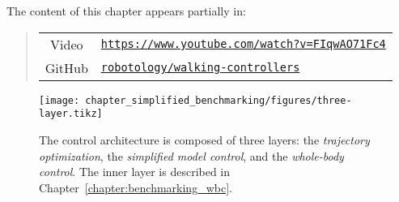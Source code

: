 \par
The content of this chapter appears partially in:
\begin{leftbar}
	\begin{quote}%
		 \vspace{5mm}\newline 
		 \vspace{5mm} \newline
		\begin{tabular}{c p{10.0cm}}
			     Video & \href{https://www.youtube.com/watch?v=FIqwAO71Fc4}{\texttt{https://www.youtube.com/watch?v=FIqwAO71Fc4}} \\
			     GitHub &  \href{https://github.com/robotology/walking-controllers}{\texttt{robotology/walking-controllers}} 
		\end{tabular}
	\end{quote}
\end{leftbar}

\begin{figure}[t]
    \centering
    \texttt{[image: chapter\_simplified\_benchmarking/figures/three-layer.tikz]}
    \caption[The three layer controller architecture for bipedal locomotion in rigid environment]{The control architecture is composed of three layers: the \emph{trajectory optimization}, the \emph{simplified model control}, and the \emph{whole-body control}. The inner layer is described in Chapter~\ref{chapter:benchmarking_wbc}.
    \label{fig:three-layer-simplified-benchmarking}}
\end{figure}






